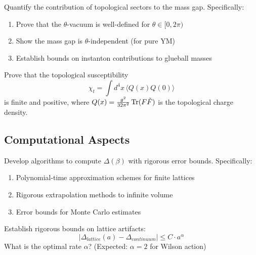 \begin{problem}
Quantify the contribution of topological sectors to the mass gap. Specifically:
\begin{enumerate}[label=(\alph*)]
\item Prove that the $\theta$-vacuum is well-defined for $\theta \in [0, 2\pi)$
\item Show the mass gap is $\theta$-independent (for pure YM)
\item Establish bounds on instanton contributions to glueball masses
\end{enumerate}
\end{problem}

\begin{problem}
Prove that the topological susceptibility
\[
\chi_t = \int d^4x \, \langle Q(x) Q(0) \rangle
\]
is finite and positive, where $Q(x) = \frac{g^2}{32\pi^2} \operatorname{Tr}(F \tilde{F})$ 
is the topological charge density.
\end{problem}

\subsection{Computational Aspects}

\begin{problem}
Develop algorithms to compute $\Delta(\beta)$ with rigorous error bounds. 
Specifically:
\begin{enumerate}[label=(\alph*)]
\item Polynomial-time approximation schemes for finite lattices
\item Rigorous extrapolation methods to infinite volume
\item Error bounds for Monte Carlo estimates
\end{enumerate}
\end{problem}

\begin{problem}
Establish rigorous bounds on lattice artifacts:
\[
|\Delta_{lattice}(a) - \Delta_{continuum}| \leq C \cdot a^\alpha
\]
What is the optimal rate $\alpha$? (Expected: $\alpha = 2$ for Wilson action)
\end{problem}







